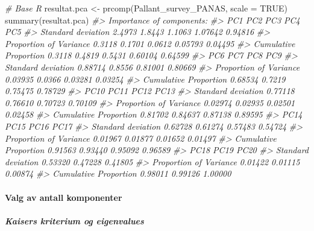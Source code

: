 \documentclass[
]{article}
\newenvironment{Shaded}{\begin{snugshade}}{\end{snugshade}}
\newcommand{\AttributeTok}[1]{\textcolor[rgb]{0.77,0.63,0.00}{#1}}
\newcommand{\CommentTok}[1]{\textcolor[rgb]{0.56,0.35,0.01}{\textit{#1}}}
\newcommand{\ConstantTok}[1]{\textcolor[rgb]{0.00,0.00,0.00}{#1}}
\newcommand{\FunctionTok}[1]{\textcolor[rgb]{0.00,0.00,0.00}{#1}}
\newcommand{\NormalTok}[1]{#1}
\newcommand{\OtherTok}[1]{\textcolor[rgb]{0.56,0.35,0.01}{#1}}
\begin{document}
\begin{Shaded}
\begin{Highlighting}[]
\CommentTok{\# Base R}
\NormalTok{resultat.pca }\OtherTok{\textless{}{-}} \FunctionTok{prcomp}\NormalTok{(Pallant\_survey\_PANAS, }\AttributeTok{scale =} \ConstantTok{TRUE}\NormalTok{)}
\FunctionTok{summary}\NormalTok{(resultat.pca)}
\CommentTok{\#\textgreater{} Importance of components:}
\CommentTok{\#\textgreater{}                           PC1    PC2    PC3     PC4     PC5}
\CommentTok{\#\textgreater{} Standard deviation     2.4973 1.8443 1.1063 1.07642 0.94816}
\CommentTok{\#\textgreater{} Proportion of Variance 0.3118 0.1701 0.0612 0.05793 0.04495}
\CommentTok{\#\textgreater{} Cumulative Proportion  0.3118 0.4819 0.5431 0.60104 0.64599}
\CommentTok{\#\textgreater{}                            PC6    PC7     PC8     PC9}
\CommentTok{\#\textgreater{} Standard deviation     0.88714 0.8556 0.81001 0.80669}
\CommentTok{\#\textgreater{} Proportion of Variance 0.03935 0.0366 0.03281 0.03254}
\CommentTok{\#\textgreater{} Cumulative Proportion  0.68534 0.7219 0.75475 0.78729}
\CommentTok{\#\textgreater{}                           PC10    PC11    PC12    PC13}
\CommentTok{\#\textgreater{} Standard deviation     0.77118 0.76610 0.70723 0.70109}
\CommentTok{\#\textgreater{} Proportion of Variance 0.02974 0.02935 0.02501 0.02458}
\CommentTok{\#\textgreater{} Cumulative Proportion  0.81702 0.84637 0.87138 0.89595}
\CommentTok{\#\textgreater{}                           PC14    PC15    PC16    PC17}
\CommentTok{\#\textgreater{} Standard deviation     0.62728 0.61274 0.57483 0.54724}
\CommentTok{\#\textgreater{} Proportion of Variance 0.01967 0.01877 0.01652 0.01497}
\CommentTok{\#\textgreater{} Cumulative Proportion  0.91563 0.93440 0.95092 0.96589}
\CommentTok{\#\textgreater{}                           PC18    PC19    PC20}
\CommentTok{\#\textgreater{} Standard deviation     0.53320 0.47228 0.41805}
\CommentTok{\#\textgreater{} Proportion of Variance 0.01422 0.01115 0.00874}
\CommentTok{\#\textgreater{} Cumulative Proportion  0.98011 0.99126 1.00000}
\end{Highlighting}
\end{Shaded}

\hypertarget{valg-av-antall-komponenter}{%
\paragraph{Valg av antall komponenter}\label{valg-av-antall-komponenter}}

\hypertarget{kaisers-kriterium-og-eigenvalues}{%
\subparagraph{Kaisers kriterium og eigenvalues}\label{kaisers-kriterium-og-eigenvalues}}
\end{document}

